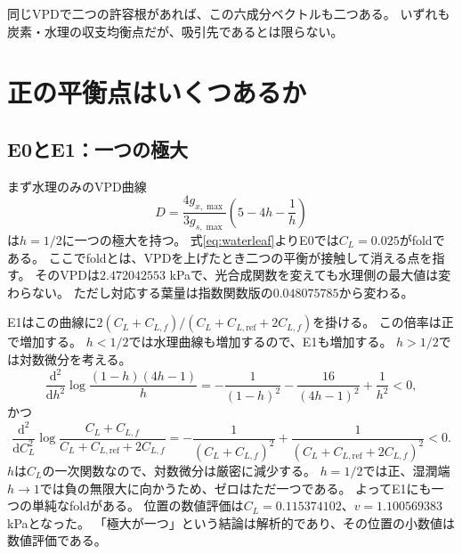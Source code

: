 \documentclass[a4paper,11pt]{ltjsarticle}
\newcommand{\dd}{\mathrm{d}}
\begin{document}
同じVPDで二つの許容根があれば、この六成分ベクトルも二つある。
いずれも炭素・水理の収支均衡点だが、吸引先であるとは限らない。

\section{正の平衡点はいくつあるか}
\subsection{E0とE1：一つの極大}
まず水理のみのVPD曲線
\begin{equation}
 D=\frac{4g_{x,\max}}{3g_{s,\max}}\left(5-4h-\frac1h\right)
\end{equation}
は$h=1/2$に一つの極大を持つ。
式\eqref{eq:waterleaf}よりE0では$C_L=0.025$がfoldである。
ここでfoldとは、VPDを上げたとき二つの平衡が接触して消える点を指す。
そのVPDは$2.472042553$ kPaで、光合成関数を変えても水理側の最大値は変わらない。
ただし対応する葉量は指数関数版の$0.048075785$から変わる。

E1はこの曲線に$2(C_L+C_{L,f})/(C_L+C_{L,\mathrm{ref}}+2C_{L,f})$を掛ける。
この倍率は正で増加する。
$h<1/2$では水理曲線も増加するので、E1も増加する。
$h>1/2$では対数微分を考える。
\begin{equation}
 \frac{\dd^2}{\dd h^2}\log\frac{(1-h)(4h-1)}h
 =-\frac1{(1-h)^2}-\frac{16}{(4h-1)^2}+\frac1{h^2}<0,
\end{equation}
かつ
\begin{equation}
 \frac{\dd^2}{\dd C_L^2}
 \log\frac{C_L+C_{L,f}}{C_L+C_{L,\mathrm{ref}}+2C_{L,f}}
 =-\frac1{(C_L+C_{L,f})^2}
   +\frac1{(C_L+C_{L,\mathrm{ref}}+2C_{L,f})^2}<0.
\end{equation}
$h$は$C_L$の一次関数なので、対数微分は厳密に減少する。
$h=1/2$では正、湿潤端$h\to1$では負の無限大に向かうため、ゼロはただ一つである。
よってE1にも一つの単純なfoldがある。
位置の数値評価は$C_L=0.115374102$、$v=1.100569383$ kPaとなった。
「極大が一つ」という結論は解析的であり、その位置の小数値は数値評価である。
\end{document}
